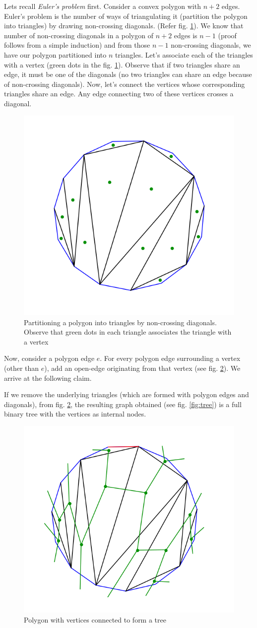 Lets recall \emph{Euler's problem} first. Consider a convex polygon with $n+2$ edges. Euler's problem is the number of ways of triangulating it (partition the polygon into triangles) by drawing non-crossing diagonals. (Refer fig. \ref{fig:Euler's-polygon}). We know that number of non-crossing diagonals in a polygon of $n+2$ edges is $n-1$ (proof follows from a simple induction) and from those $n-1$ non-crossing diagonals, we have our polygon partitioned into $n$ triangles. Let's associate each of the triangles with a vertex (green dots in the fig. \ref{fig:Euler's-polygon}). Observe that if two triangles share an edge, it must be one of the diagonals (no two triangles can share an edge because of non-crossing diagonals). Now, let's connect the vertices whose corresponding triangles share an edge. Any edge connecting two of these vertices crosses a diagonal. 
\begin{figure}[h!]
    \centering
    \includegraphics[width=0.4\linewidth]{images/polygon.png}
    \caption{Partitioning a polygon into triangles by non-crossing diagonals. Observe that green dots in each triangle associates the triangle with a vertex}
    \label{fig:Euler's-polygon}
\end{figure}
Now, consider a polygon edge $e$. For every polygon edge surrounding a vertex (other than $e$), add an open-edge originating from that vertex (see fig. \ref{fig:tree-in-polygon}). We arrive at the following claim.  
\begin{claim}
	If we remove the underlying triangles (which are formed with polygon edges and diagonals), from fig. \ref{fig:tree-in-polygon}, the 		resulting graph obtained (see fig. \ref{fig:tree}) is a full binary tree with the vertices as internal nodes.
\end{claim}
\begin{figure}[h!]
    \centering
    \includegraphics[width=0.4\linewidth]{images/polygon-tree.png}
    \caption{Polygon with vertices connected to form a tree}
    \label{fig:tree-in-polygon}
\end{figure}
